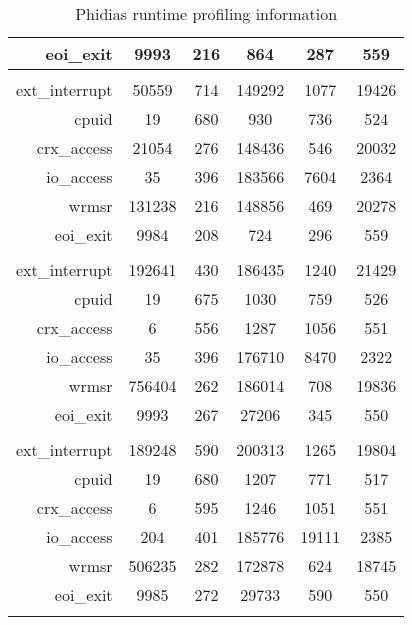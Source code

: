 \begin{longtable}{|r|c|c|c|c|c|}
            eoi\_exit	& 9993	& 216	& 864	& 287	& 559 \\ \hline
	\multicolumn{6}{|c|}{\textbf{\mmmapops{}}} \\ \hline
       ext\_interrupt	& 50559	& 714	& 149292	& 1077	& 19426 \\
               cpuid	& 19	& 680	& 930	& 736	& 524 \\ 
          crx\_access	& 21054	& 276	& 148436	& 546	& 20032 \\
           io\_access	& 35	& 396	& 183566	& 7604	& 2364 \\ 
               wrmsr	& 131238	& 216	& 148856	& 469	& 20278 \\
            eoi\_exit	& 9984	& 208	& 724	& 296	& 559 \\ \hline
	\multicolumn{6}{|c|}{\textbf{\mstdout{}}} \\ \hline
       ext\_interrupt	& 192641	& 430	& 186435	& 1240	& 21429 \\
               cpuid	& 19	& 675	& 1030	& 759	& 526 \\
          crx\_access	& 6	& 556	& 1287	& 1056	& 551 \\
           io\_access	& 35	& 396	& 176710	& 8470	& 2322 \\
               wrmsr	& 756404	& 262	& 186014	& 708	& 19836 \\
            eoi\_exit	& 9993	& 267	& 27206	& 345	& 550 \\ \hline
	\multicolumn{6}{|c|}{\textbf{\mthreadops{}}} \\ \hline
       ext\_interrupt	& 189248	& 590	& 200313	& 1265	& 19804 \\ 
               cpuid	& 19	& 680	& 1207	& 771	& 517 \\ 
          crx\_access	& 6	& 595	& 1246	& 1051	& 551 \\ 
           io\_access	& 204	& 401	& 185776	& 19111	& 2385 \\
               wrmsr	& 506235	& 282	& 172878	& 624	& 18745 \\ 
            eoi\_exit	& 9985	& 272	& 29733	& 590	& 550 \\ \hline

\caption{Phidias runtime profiling information} 
\label{phidias-runtime-detailed}
\end{longtable}

